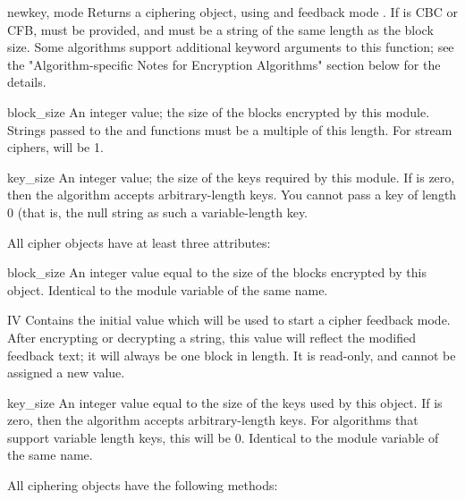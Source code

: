\documentclass{howto}
\begin{document}
\begin{funcdesc}{new}{key, mode}
Returns a ciphering object, using  and feedback mode
.  If  is CBC or CFB,  must be provided,
and must be a string of the same length as the block size.  Some
algorithms support additional keyword arguments to this function; see
the "Algorithm-specific Notes for Encryption Algorithms" section below for the details.
\end{funcdesc}

\begin{datadesc}{block_size}
An integer value; the size of the blocks encrypted by this module.
Strings passed to the  and  functions
must be a multiple of this length.  For stream ciphers,
 will be 1. 
\end{datadesc}

\begin{datadesc}{key_size}
An integer value; the size of the keys required by this module.  If
 is zero, then the algorithm accepts arbitrary-length
keys.  You cannot pass a key of length 0 (that is, the null string
 as such a variable-length key.  
\end{datadesc}

All cipher objects have at least three attributes:

\begin{memberdesc}{block_size}
An integer value equal to the size of the blocks encrypted by this object.
Identical to the module variable of the same name.
\end{memberdesc}

\begin{memberdesc}{IV}
Contains the initial value which will be used to start a cipher
feedback mode.  After encrypting or decrypting a string, this value
will reflect the modified feedback text; it will always be one block
in length.  It is read-only, and cannot be assigned a new value.
\end{memberdesc}

\begin{memberdesc}{key_size}
An integer value equal to the size of the keys used by this object.  If
 is zero, then the algorithm accepts arbitrary-length
keys.  For algorithms that support variable length keys, this will be 0.
Identical to the module variable of the same name.  
\end{memberdesc}

All ciphering objects have the following methods:
\end{document}
